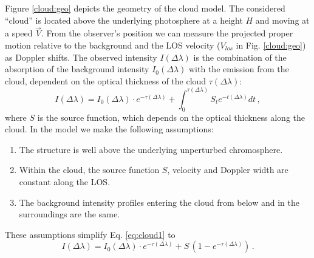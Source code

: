 Figure \ref{cloud:geo} depicts the geometry of the cloud model. The considered ``cloud'' is located above the underlying photosphere at a height $H$ and moving  at a speed $\vec V$. From the observer's position we can measure the projected proper motion relative to the background and the LOS velocity ($V_{los}$ in Fig. \ref{cloud:geo}) as Doppler shifts. The observed intensity $I(\Delta \lambda)$ is the combination of the absorption of the background intensity $I_{0}(\Delta \lambda)$ with the emission from the cloud, dependent on the optical thickness of the cloud $\tau(\Delta \lambda)$:
\begin{equation}
I(\Delta \lambda)= I_{0}(\Delta \lambda)\cdot e^{-\tau(\Delta \lambda)}+ \int_{0}^{\tau(\Delta \lambda)}  S_{t}e^{-t(\Delta \lambda)}dt \,,
\label{eq:cloud1}
\end{equation}
where $S$ is the source function, which depends on the optical thickness along the cloud. In the model we make the following assumptions:
\begin{enumerate}
\item The structure is well above the underlying unperturbed chromosphere.
\item Within the cloud, the source function $S$, velocity and  Doppler width are constant along the LOS.
\item The background intensity profiles entering the cloud from below and in the surroundings are the same.  
\end{enumerate}

These assumptions simplify Eq. \ref{eq:cloud1} to
\begin{equation}
I(\Delta \lambda)= I_{0}(\Delta \lambda)\cdot e^{-\tau(\Delta \lambda)}+  S \, (1-e^{-\tau(\Delta \lambda)}) \,.
\label{eq:cloud2}
\end{equation}

